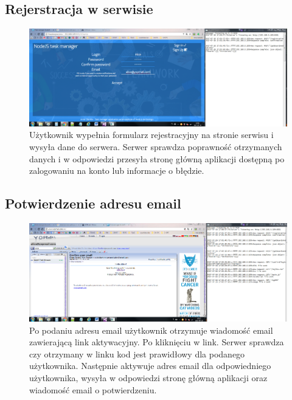 \documentclass[12pt]{report}
\begin{document}
\subsection{Rejerstracja w serwisie}
\begin{figure}[!hb]
\centering
\includegraphics[width=\textwidth,height=\textheight,keepaspectratio]{22.png}
\captionsetup{labelformat=empty}
\caption[]{Użytkownik wypełnia formularz rejestracyjny na stronie serwisu i wysyła dane do serwera. 
Serwer sprawdza poprawność otrzymanych danych i w odpowiedzi przesyła stronę główną aplikacji dostępną po zalogowaniu na konto lub informacje o błędzie.}
\end{figure}

\subsection{Potwierdzenie adresu email}
\begin{figure}[!hb]
\centering
\includegraphics[width=\textwidth,height=\textheight,keepaspectratio]{32.png}
\captionsetup{labelformat=empty}
\caption[]{Po podaniu adresu email użytkownik otrzymuje wiadomość email zawierającą link aktywacyjny. 
Po kliknięciu w link. Serwer sprawdza czy otrzymany w linku kod jest prawidłowy dla podanego użytkownika. 
Następnie aktywuje adres email dla odpowiedniego użytkownika, wysyła w odpowiedzi stronę główną aplikacji oraz wiadomość email o potwierdzeniu.}
\end{figure}

\newpage 
\end{document}
